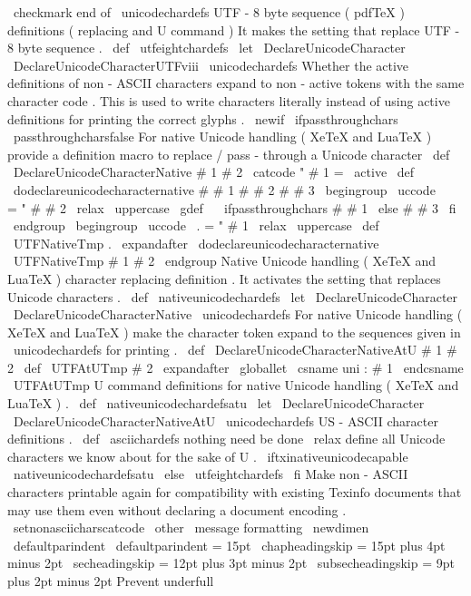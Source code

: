 {{{{{{\
checkmark
}
%
}
%
end
of
\
unicodechardefs
%
UTF
-
8
byte
sequence
(
pdfTeX
)
definitions
(
replacing
and
U
command
)
%
It
makes
the
setting
that
replace
UTF
-
8
byte
sequence
.
\
def
\
utfeightchardefs
{
%
\
let
\
DeclareUnicodeCharacter
\
DeclareUnicodeCharacterUTFviii
\
unicodechardefs
}
%
Whether
the
active
definitions
of
non
-
ASCII
characters
expand
to
%
non
-
active
tokens
with
the
same
character
code
.
This
is
used
to
%
write
characters
literally
instead
of
using
active
definitions
for
%
printing
the
correct
glyphs
.
\
newif
\
ifpassthroughchars
\
passthroughcharsfalse
%
For
native
Unicode
handling
(
XeTeX
and
LuaTeX
)
%
provide
a
definition
macro
to
replace
/
pass
-
through
a
Unicode
character
%
\
def
\
DeclareUnicodeCharacterNative
#
1
#
2
{
%
\
catcode
"
#
1
=
\
active
\
def
\
dodeclareunicodecharacternative
#
#
1
#
#
2
#
#
3
{
%
\
begingroup
\
uccode
\
~
=
"
#
#
2
\
relax
\
uppercase
{
\
gdef
~
}
{
%
\
ifpassthroughchars
#
#
1
%
\
else
#
#
3
%
\
fi
}
\
endgroup
}
\
begingroup
\
uccode
\
.
=
"
#
1
\
relax
\
uppercase
{
\
def
\
UTFNativeTmp
{
.
}
}
%
\
expandafter
\
dodeclareunicodecharacternative
\
UTFNativeTmp
{
#
1
}
{
#
2
}
%
\
endgroup
}
%
Native
Unicode
handling
(
XeTeX
and
LuaTeX
)
character
replacing
definition
.
%
It
activates
the
setting
that
replaces
Unicode
characters
.
\
def
\
nativeunicodechardefs
{
%
\
let
\
DeclareUnicodeCharacter
\
DeclareUnicodeCharacterNative
\
unicodechardefs
}
%
For
native
Unicode
handling
(
XeTeX
and
LuaTeX
)
%
make
the
character
token
expand
%
to
the
sequences
given
in
\
unicodechardefs
for
printing
.
\
def
\
DeclareUnicodeCharacterNativeAtU
#
1
#
2
{
%
\
def
\
UTFAtUTmp
{
#
2
}
\
expandafter
\
globallet
\
csname
uni
:
#
1
\
endcsname
\
UTFAtUTmp
}
%
U
command
definitions
for
native
Unicode
handling
(
XeTeX
and
LuaTeX
)
.
\
def
\
nativeunicodechardefsatu
{
%
\
let
\
DeclareUnicodeCharacter
\
DeclareUnicodeCharacterNativeAtU
\
unicodechardefs
}
%
US
-
ASCII
character
definitions
.
\
def
\
asciichardefs
{
%
nothing
need
be
done
\
relax
}
%
define
all
Unicode
characters
we
know
about
for
the
sake
of
U
.
\
iftxinativeunicodecapable
\
nativeunicodechardefsatu
\
else
\
utfeightchardefs
\
fi
%
Make
non
-
ASCII
characters
printable
again
for
compatibility
with
%
existing
Texinfo
documents
that
may
use
them
even
without
declaring
a
%
document
encoding
.
%
\
setnonasciicharscatcode
\
other
\
message
{
formatting
}
\
newdimen
\
defaultparindent
\
defaultparindent
=
15pt
\
chapheadingskip
=
15pt
plus
4pt
minus
2pt
\
secheadingskip
=
12pt
plus
3pt
minus
2pt
\
subsecheadingskip
=
9pt
plus
2pt
minus
2pt
%
Prevent
underfull
}}}}
